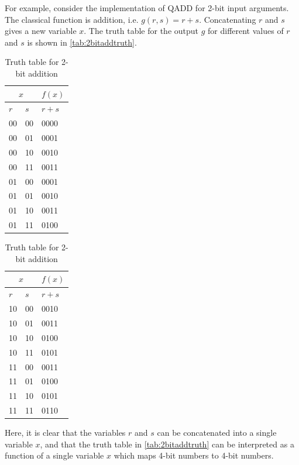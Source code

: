 For example, consider the implementation of QADD for 2-bit input arguments. The classical function is addition, i.e. $g(r,s) = r+s$. Concatenating $r$ and $s$ gives a new variable $x$. The truth table for the output $g$ for different values of $r$ and $s$ is shown in \autoref{tab:2bitaddtruth}.
\begin{table}[!htb]
    \caption{Truth table for 2-bit addition}
    \label{tab:2bitaddtruth}
    \begin{subtable}{.5\linewidth}
      \centering
        \begin{tabular}{|l|l||l|}
        \hline
        \multicolumn{2}{|c||}{$x$} & $f(x)$\\
        \hline
        $r$ & $s$ & $r+s$ \\ \hline
        00       & 00       & 0000       \\ 
        00       & 01       & 0001       \\ 
        00       & 10       & 0010       \\ 
        00       & 11       & 0011       \\
        01       & 00       & 0001       \\ 
        01       & 01       & 0010       \\ 
        01       & 10       & 0011       \\ 
        01       & 11       & 0100       \\
        \hline
    \end{tabular}
    \end{subtable}
    \begin{subtable}{.5\linewidth}
      \centering
        \begin{tabular}{|l|l||l|}
        \hline
        \multicolumn{2}{|c||}{$x$} & $f(x)$\\
        \hline
        $r$ & $s$ & $r+s$ \\ \hline
        10       & 00       & 0010       \\ 
        10       & 01       & 0011       \\ 
        10       & 10       & 0100       \\ 
        10       & 11       & 0101       \\
        11       & 00       & 0011       \\ 
        11       & 01       & 0100       \\ 
        11       & 10       & 0101       \\ 
        11       & 11       & 0110       \\
        \hline
    \end{tabular}
    \end{subtable} 
\end{table}
Here, it is clear that the variables $r$ and $s$ can be concatenated into a single variable $x$, and that the truth table in \autoref{tab:2bitaddtruth} can be interpreted as a function of a single variable $x$ which maps 4-bit numbers to 4-bit numbers. 

